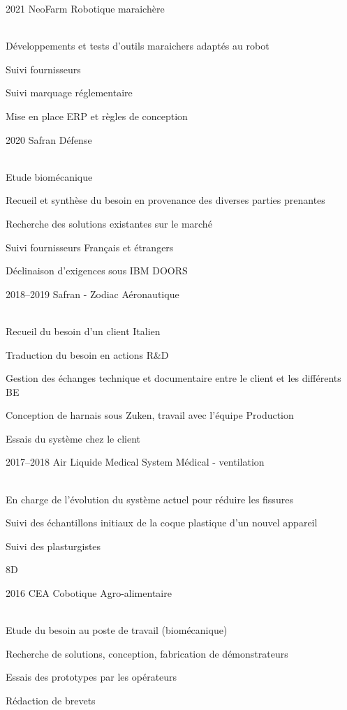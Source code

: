 \documentclass{cv-style}     %
\begin{document}
\begin{entrylist}
\entry
  {2021}
  {NeoFarm}
  {Robotique maraichère}
  {\\
   Développements et tests d'outils maraichers adaptés au robot

   Suivi fournisseurs

   Suivi marquage réglementaire

   Mise en place ERP et règles de conception
   }
 
\entry
  {2020}
  {Safran}
  {Défense}
  {\\
  Etude biomécanique

  Recueil et synthèse du besoin en provenance des diverses parties prenantes

  Recherche des solutions existantes sur le marché

  Suivi fournisseurs Français et étrangers

  Déclinaison d’exigences sous IBM DOORS 
  }
\entry
  {2018--2019}
  {Safran - Zodiac}
  {Aéronautique}
  {\\
  Recueil du besoin d'un client Italien

  Traduction du besoin en actions R\&D

  Gestion des échanges technique et documentaire entre le client et les différents BE

  Conception de harnais sous Zuken, travail avec l'équipe Production

  Essais du système chez le client
 
  }
\entry
 {2017--2018}
 {Air Liquide Medical System}
 {Médical - ventilation}
 {\\
 En charge de l'évolution du système actuel pour réduire les fissures

 Suivi des échantillons initiaux de la coque plastique d'un nouvel appareil

 Suivi des plasturgistes

 8D
 }
\entry
 {2016}
 {CEA}
 {Cobotique Agro-alimentaire}
 {\\
 Etude du besoin au poste de travail (biomécanique)

 Recherche de solutions, conception, fabrication de démonstrateurs

 Essais des prototypes par les opérateurs

 Rédaction de brevets
 }

\end{entrylist}
\end{document}
